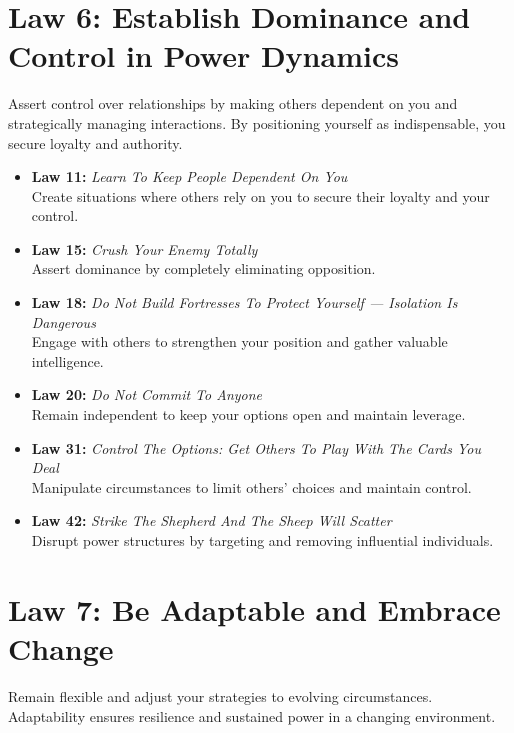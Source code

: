 \documentclass[a4paper,10.8pt]{article}
\begin{document}
\section*{Law 6: Establish Dominance and Control in Power Dynamics}
Assert control over relationships by making others dependent on you and strategically managing interactions. By positioning yourself as indispensable, you secure loyalty and authority.

\begin{itemize}[leftmargin=*, label={--}]
    \item \textbf{Law 11:} \textit{Learn To Keep People Dependent On You} \\
    Create situations where others rely on you to secure their loyalty and your control.
    
    \item \textbf{Law 15:} \textit{Crush Your Enemy Totally} \\
    Assert dominance by completely eliminating opposition.
    
    \item \textbf{Law 18:} \textit{Do Not Build Fortresses To Protect Yourself — Isolation Is Dangerous} \\
    Engage with others to strengthen your position and gather valuable intelligence.
    
    \item \textbf{Law 20:} \textit{Do Not Commit To Anyone} \\
    Remain independent to keep your options open and maintain leverage.
    
    \item \textbf{Law 31:} \textit{Control The Options: Get Others To Play With The Cards You Deal} \\
    Manipulate circumstances to limit others' choices and maintain control.
    
    \item \textbf{Law 42:} \textit{Strike The Shepherd And The Sheep Will Scatter} \\
    Disrupt power structures by targeting and removing influential individuals.
\end{itemize}

\section*{Law 7: Be Adaptable and Embrace Change}
Remain flexible and adjust your strategies to evolving circumstances. Adaptability ensures resilience and sustained power in a changing environment.
\end{document}
